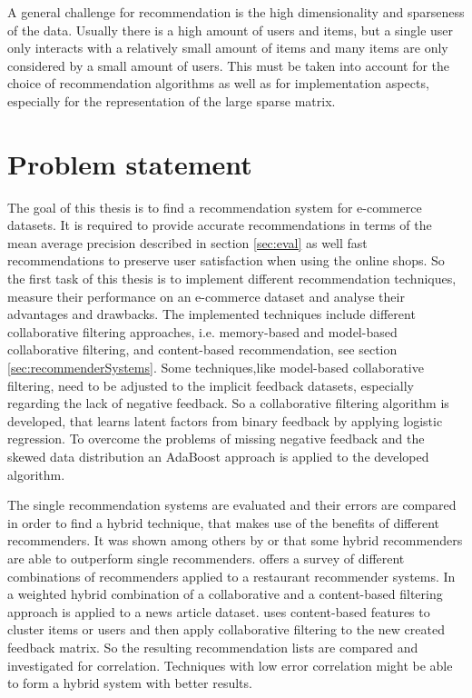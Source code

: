 \documentclass[10pt]{reportMaster}
\begin{document}
A general challenge for recommendation is the high dimensionality and sparseness of the data.
Usually there is a high amount of users and items, but a single user only interacts with a relatively small amount of items and many items are only considered by a small amount of users.
This must be taken into account for the choice of recommendation algorithms as well as for implementation aspects, especially for the representation of the large sparse matrix.


\section{Problem statement}
The goal of this thesis is to find a recommendation system for e-commerce datasets.
It is required to provide accurate recommendations in terms of the mean average precision described in section \ref{sec:eval} as well fast recommendations to preserve user satisfaction when using the online shops.
So the first task of this thesis is to implement different recommendation techniques, measure their performance on an e-commerce dataset and analyse their advantages and drawbacks.
The implemented techniques include different collaborative filtering approaches, i.e. memory-based and model-based collaborative filtering, and content-based recommendation, see section \ref{sec:recommenderSystems}.
Some techniques,like model-based collaborative filtering, need to be adjusted to the implicit feedback datasets, especially regarding the lack of negative feedback.
So a collaborative filtering algorithm is developed, that learns latent factors from binary feedback by applying logistic regression.
To overcome the problems of missing negative feedback and the skewed data distribution an AdaBoost approach is applied to the developed algorithm.

The single recommendation systems are evaluated and their errors are compared in order to find a hybrid technique, that makes use of the benefits of different recommenders.
It was shown among others by \cite{hybridSurvey} or \cite{hybridcfcbClaypool} that some hybrid recommenders are able to outperform single recommenders.
\cite{hybridSurvey} offers a survey of different combinations of recommenders applied to a restaurant recommender systems.
In \cite{hybridcfcbClaypool} a weighted hybrid combination of a collaborative and a content-based filtering approach is applied to a news article dataset.
\cite{hybridCFCBClustringLi} uses content-based features to cluster items or users and then apply collaborative filtering to the new created feedback matrix. %
So the resulting recommendation lists are compared and investigated for correlation.
Techniques with low error correlation might be able to form a hybrid system with better results.
\end{document}
